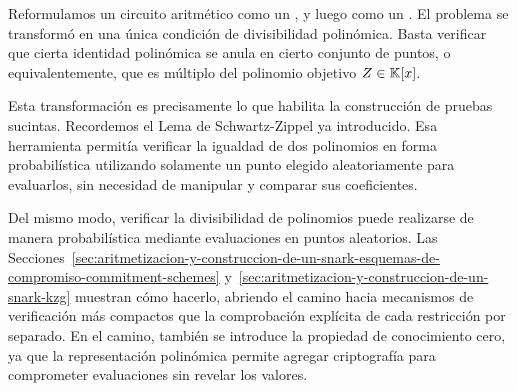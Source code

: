 Reformulamos un circuito aritmético como un \ROneCS, y luego como un \QAP. El problema se transformó en una única condición de divisibilidad polinómica. Basta verificar que cierta identidad polinómica se anula en cierto conjunto de puntos, o equivalentemente, que es múltiplo del polinomio objetivo $Z \in \mathbb{K}[x]$.

Esta transformación es precisamente lo que habilita la construcción de pruebas sucintas. Recordemos el Lema de Schwartz-Zippel ya introducido. Esa herramienta permitía verificar la igualdad de dos polinomios en forma probabilística utilizando solamente un punto elegido aleatoriamente para evaluarlos, sin necesidad de manipular y comparar sus coeficientes.

Del mismo modo, verificar la divisibilidad de polinomios puede realizarse de manera probabilística mediante evaluaciones en puntos aleatorios. Las Secciones~\ref{sec:aritmetizacion-y-construccion-de-un-snark-esquemas-de-compromiso-commitment-schemes} y~\ref{sec:aritmetizacion-y-construccion-de-un-snark-kzg} muestran cómo hacerlo, abriendo el camino hacia mecanismos de verificación más compactos que la comprobación explícita de cada restricción por separado. En el camino, también se introduce la propiedad de conocimiento cero, ya que la representación polinómica permite agregar criptografía para comprometer evaluaciones sin revelar los valores.
